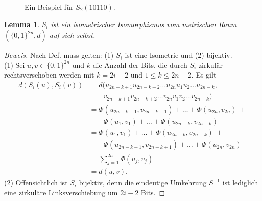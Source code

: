 \documentclass[11pt]{article}
\newtheorem{lemma}{Lemma}
\theoremstyle{break}
\theoremstyle{norm}
\begin{document}
\begin{figure}[H]
    \centering
{}
    \caption{Ein Beispiel für $S_2(10110)$.}
    \label{fig:enter-label}
\end{figure}
\begin{lemma}
$S_i$ ist ein isometrischer Isomorphismus vom metrischen Raum $(\{0,1\}^{2n},d)$ auf sich selbst.
\end{lemma}
\begin{proof}[Beweis]
 Nach Def. muss gelten: (1) $S_i$ ist eine Isometrie und (2) bijektiv.\\
(1) Sei $u,v\in\{0,1\}^{2n}$ und $k$ die Anzahl der Bits, die durch $S_i$ zirkulär rechtsverschoben werden mit $k=2i-2$ und $1\leq k \leq 2n-2$. Es gilt
\begin{align*}
    d(S_i(u),S_i(v)) &= d(u_{2n-k+1}u_{2n-k+2}\ldots u_{2n}u_1u_2\ldots u_{2n-k},\\
    &\qquad v_{2n-k+1}v_{2n-k+2}\ldots v_{2n}v_1v_2\ldots v_{2n-k})\\
    &= \Phi(u_{2n-k+1}, v_{2n-k+1}) + \ldots + \Phi(u_{2n},v_{2n})\ + \\
    &\qquad \Phi(u_{1},v_{1}) + \ldots + \Phi(u_{2n-k},v_{2n-k})\\
    &= \Phi(u_{1},v_{1}) + \ldots + \Phi(u_{2n-k},v_{2n-k})\ + \\
    &\qquad \Phi(u_{2n-k+1}, v_{2n-k+1}) + \ldots + \Phi(u_{2n},v_{2n})\\
    &= \sum_{j=1}^{2n}\Phi(u_j,v_j)\\
    &= d(u,v).
\end{align*}
(2) Offensichtlich ist $S_i$ bijektiv, denn die eindeutige Umkehrung $S^{-1}$ ist lediglich eine zirkuläre Linksverschiebung um $2i-2$ Bits.   
\end{proof}
\end{document}
